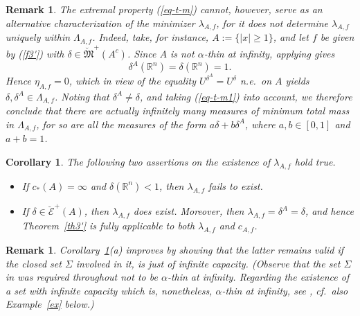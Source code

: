 \documentclass[12pt,a4paper,reqno]{amsart} %
\theoremstyle{lause}
\theoremstyle{maaritelma}
\theoremstyle{lause}
\newtheorem{corollary}[theorem]{Corollary}
\theoremstyle{maaritelma}
\newtheorem{remark}[theorem]{Remark}
\numberwithin{equation}{section}
\begin{document}
\begin{remark}\label{t-m-nonun} The extremal property (\ref{eq-t-m}) cannot, however, serve as an alternative characterization of the minimizer $\lambda_{A,f}$, for it does not determine $\lambda_{A,f}$ uniquely within $\Lambda_{A,f}$. Indeed, take, for instance, $A:=\{|x|\geqslant 1\}$, and let $f$ be given by (\ref{f3'}) with $\delta\in\breve{\mathfrak M}^+(A^c)$. Since $A$ is {\it not} $\alpha$-thin at infinity, applying \cite[Corollary~5.3]{Z-bal2} gives
\begin{equation}\label{eq-t-m1}\delta^A(\mathbb R^n)=\delta(\mathbb R^n)=1.\end{equation}
Hence $\eta_{A,f}=0$, which in view of the equality $U^{\delta^A}=U^\delta$ n.e.\ on $A$  \cite[Eq.~(1.11)]{Z-bal2} yields $\delta,\delta^A\in\Lambda_{A,f}$. Noting that $\delta^A\ne\delta$, and taking (\ref{eq-t-m1}) into account, we therefore conclude that there are actually infinitely many measures of minimum total mass in $\Lambda_{A,f}$, for so are all the measures of the form $a\delta+b\delta^A$, where $a,b\in[0,1]$ and $a+b=1$.\end{remark}

\begin{corollary}\label{cor2}The following two assertions on the existence of $\lambda_{A,f}$ hold true.
\begin{itemize}
\item[{\rm(a)}] If $c_*(A)=\infty$ and $\delta(\mathbb R^n)<1$, then $\lambda_{A,f}$ fails to exist.
\item[{\rm(b)}] If $\delta\in\breve{\mathcal E}^+(A)$, then $\lambda_{A,f}$ does exist. Moreover, then
   $\lambda_{A,f}=\delta^A=\delta$, and hence
  Theorem~{\rm\ref{th3'}} is fully applicable to both $\lambda_{A,f}$ and $c_{A,f}$.
  \end{itemize}
\end{corollary}

\begin{remark}\label{f-stre}Corollary~\ref{cor2}(a) improves \cite[Corollary~2.6(ii)]{Dr0} by showing that the latter remains valid if the closed set $\Sigma$ involved in it, is just of infinite capacity. (Observe that the set $\Sigma$ in \cite{Dr0} was required throughout not to be $\alpha$-thin at infinity. Regarding the existence of a set with infinite capacity which is, nonetheless, $\alpha$-thin at infinity, see \cite[Remark~2.2]{Z-bal2}, cf.\ also Example~\ref{ex} below.)\end{remark}
\end{document}
